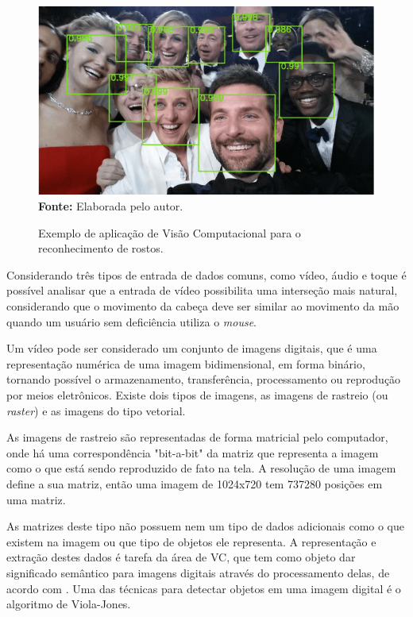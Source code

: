 \begin{figure}[htbp]
\caption{Exemplo de aplicação de Visão Computacional para o reconhecimento de rostos.}
 \centering \includegraphics[scale=1]{img/figura-1.png}
 \textbf{Fonte:} Elaborada pelo autor.
\label{fig:exemplo-vc}
\end{figure}

Considerando três tipos de entrada de dados comuns, como vídeo, áudio e toque é possível analisar que a entrada de vídeo possibilita uma interseção mais natural, considerando que o movimento da cabeça deve ser similar ao movimento da mão quando um usuário sem deficiência utiliza o \textit{mouse}.

Um vídeo pode ser considerado um conjunto de imagens digitais, que é uma representação numérica de uma imagem bidimensional, em forma binário, tornando possível o armazenamento, transferência, processamento ou reprodução por meios eletrônicos. Existe dois tipos de imagens, as imagens de rastreio (ou \textit{raster}) e as imagens do tipo vetorial.

As imagens de rastreio são representadas de forma matricial pelo computador, onde há uma correspondência "bit-a-bit" da matriz que representa a imagem como o que está sendo reproduzido de fato na tela. A resolução de uma imagem define a sua matriz, então uma imagem de 1024x720 tem 737280 posições em uma matriz. 

As matrizes deste tipo não possuem nem um tipo de dados adicionais como o que existem na imagem ou que tipo de objetos ele representa. A representação e extração destes dados é tarefa da área de VC, que tem como objeto dar significado semântico para imagens digitais através do processamento delas, de acordo com . Uma das técnicas para detectar objetos em uma imagem digital é o algoritmo de Viola-Jones.

